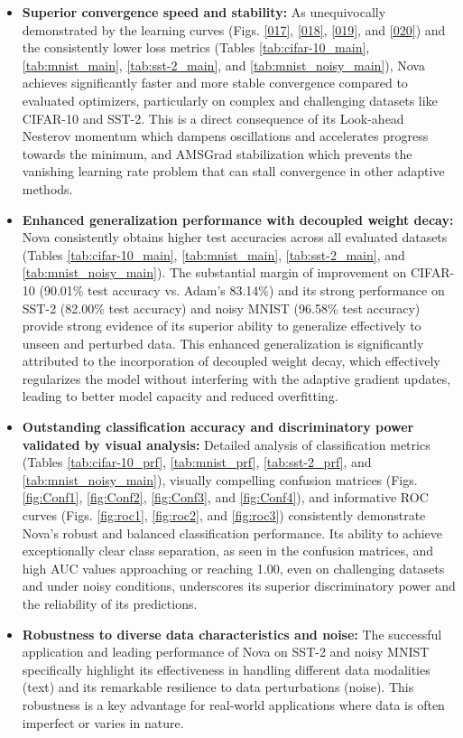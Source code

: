 \documentclass{article}
\begin{document}
\begin{itemize}
    \item \textbf{Superior convergence speed and stability:} As unequivocally demonstrated by the learning curves (Figs. \ref{017}, \ref{018}, \ref{019}, and \ref{020}) and the consistently lower loss metrics (Tables \ref{tab:cifar-10_main}, \ref{tab:mnist_main}, \ref{tab:sst-2_main}, and \ref{tab:mnist_noisy_main}), Nova achieves significantly faster and more stable convergence compared to evaluated optimizers, particularly on complex and challenging datasets like CIFAR-10 and SST-2. This is a direct consequence of its Look-ahead Nesterov momentum which dampens oscillations and accelerates progress towards the minimum, and AMSGrad stabilization which prevents the vanishing learning rate problem that can stall convergence in other adaptive methods.
    \item \textbf{Enhanced generalization performance with decoupled weight decay:} Nova consistently obtains higher test accuracies across all evaluated datasets (Tables \ref{tab:cifar-10_main}, \ref{tab:mnist_main}, \ref{tab:sst-2_main}, and \ref{tab:mnist_noisy_main}). The substantial margin of improvement on CIFAR-10 (90.01\% test accuracy vs. Adam's 83.14\%) and its strong performance on SST-2 (82.00\% test accuracy) and noisy MNIST (96.58\% test accuracy) provide strong evidence of its superior ability to generalize effectively to unseen and perturbed data. This enhanced generalization is significantly attributed to the incorporation of decoupled weight decay, which effectively regularizes the model without interfering with the adaptive gradient updates, leading to better model capacity and reduced overfitting.
    \item \textbf{Outstanding classification accuracy and discriminatory power validated by visual analysis:} Detailed analysis of classification metrics (Tables \ref{tab:cifar-10_prf}, \ref{tab:mnist_prf}, \ref{tab:sst-2_prf}, and \ref{tab:mnist_noisy_main}), visually compelling confusion matrices (Figs. \ref{fig:Conf1}, \ref{fig:Conf2}, \ref{fig:Conf3}, and \ref{fig:Conf4}), and informative ROC curves (Figs. \ref{fig:roc1}, \ref{fig:roc2}, and \ref{fig:roc3}) consistently demonstrate Nova's robust and balanced classification performance. Its ability to achieve exceptionally clear class separation, as seen in the confusion matrices, and high AUC values approaching or reaching 1.00, even on challenging datasets and under noisy conditions, underscores its superior discriminatory power and the reliability of its predictions.
    \item \textbf{Robustness to diverse data characteristics and noise:} The successful application and leading performance of Nova on SST-2 and noisy MNIST specifically highlight its effectiveness in handling different data modalities (text) and its remarkable resilience to data perturbations (noise). This robustness is a key advantage for real-world applications where data is often imperfect or varies in nature.

\end{itemize}
\end{document}
